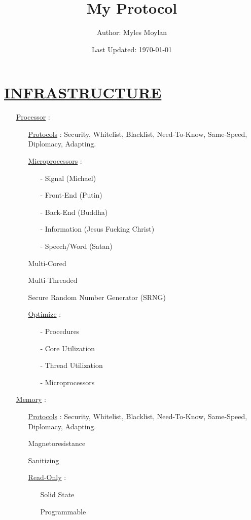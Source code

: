 \documentclass[11pt]{article}
\title{	
	\normalfont \normalsize 
	\huge My Protocol
}
\author{Author: Myles Moylan}
\date{Last Updated: \normalsize\today}
\begin{document}
\maketitle
\section*{\ul{INFRASTRUCTURE}}
\begin{enumerate}
	
	\item[] \ul{Processor} :
	\begin{enumerate}
		\item[] \ul{Protocols} : Security, Whitelist, Blacklist, Need-To-Know, Same-Speed, Diplomacy,  Adapting.
		\item[] \ul{Microprocessors} :
		\begin{enumerate}
			\item[-] Signal (Michael)
			\item[-] Front-End (Putin)
			\item[-] Back-End (Buddha)
			\item[-] Information (Jesus Fucking Christ)
			\item[-] Speech/Word (Satan)
		\end{enumerate}
		\item[] Multi-Cored
		\item[] Multi-Threaded
		\item[] Secure Random Number Generator (SRNG)
		\item[] \ul{Optimize}  :
		\begin{enumerate}
			\item[-] Procedures
			\item[-] Core Utilization
			\item[-] Thread Utilization
			\item[-] Microprocessors
		\end{enumerate}
	\end{enumerate}
	
	\item[] \ul{Memory} :
	\begin{enumerate}
		\item[] \ul{Protocols} : Security, Whitelist, Blacklist, Need-To-Know, Same-Speed, Diplomacy,  Adapting.
		\item[] Magnetoresistance
		\item[] Sanitizing
		
		\item[] \ul{Read-Only} :
		\begin{enumerate}
			\item[] Solid State
			\item[] Programmable
		\end{enumerate}
	

\end{enumerate}
\end{enumerate}
\end{document}
